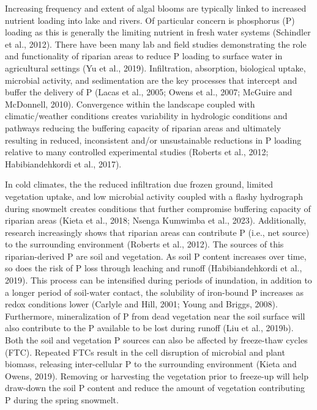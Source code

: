 \documentclass[
]{agujournal2019}
\begin{document}
Increasing frequency and extent of algal blooms are typically linked to
increased nutrient loading into lake and rivers. Of particular concern
is phosphorus (P) loading as this is generally the limiting nutrient in
fresh water systems (Schindler et al., 2012). There have been many lab
and field studies demonstrating the role and functionality of riparian
areas to reduce P loading to surface water in agricultural settings (Yu
et al., 2019). Infiltration, absorption, biological uptake, microbial
activity, and sedimentation are the key processes that intercept and
buffer the delivery of P (Lacas et al., 2005; Owens et al., 2007;
McGuire and McDonnell, 2010). Convergence within the landscape coupled
with climatic/weather conditions creates variability in hydrologic
conditions and pathways reducing the buffering capacity of riparian
areas and ultimately resulting in reduced, inconsistent and/or
unsustainable reductions in P loading relative to many controlled
experimental studies (Roberts et al., 2012; Habibiandehkordi et al.,
2017).

In cold climates, the the reduced infiltration due frozen ground,
limited vegetation uptake, and low microbial activity coupled with a
flashy hydrograph during snowmelt creates conditions that further
compromise buffering capacity of riparian areas (Kieta et al., 2018;
Nsenga Kumwimba et al., 2023). Additionally, research increasingly shows
that riparian areas can contribute P (i.e., net source) to the
surrounding environment (Roberts et al., 2012). The sources of this
riparian-derived P are soil and vegetation. As soil P content increases
over time, so does the risk of P loss through leaching and runoff
(Habibiandehkordi et al., 2019). This process can be intensified during
periods of inundation, in addition to a longer period of soil-water
contact, the solubility of iron-bound P increases as redox conditions
lower (Carlyle and Hill, 2001; Young and Briggs, 2008). Furthermore,
mineralization of P from dead vegetation near the soil surface will also
contribute to the P available to be lost during runoff (Liu et al.,
2019b). Both the soil and vegetation P sources can also be affected by
freeze-thaw cycles (FTC). Repeated FTCs result in the cell disruption of
microbial and plant biomass, releasing inter-cellular P to the
surrounding environment (Kieta and Owens, 2019). Removing or harvesting
the vegetation prior to freeze-up will help draw-down the soil P content
and reduce the amount of vegetation contributing P during the spring
snowmelt.
\end{document}
